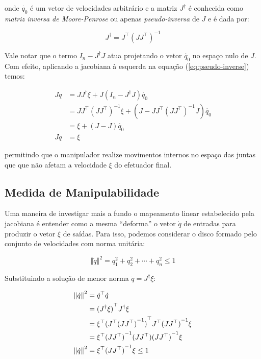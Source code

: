 onde \(\dot{q_0}\) é um vetor de velocidades arbitrário e a matriz \(J^\dag\) é
conhecida como \emph{matriz inversa de Moore-Penrose} ou apenas
\emph{pseudo-inversa} de \(J\) e é dada por:

\begin{equation}
    J^\dag = J^\top {(J J^\top)}^{-1}
\end{equation}

Vale notar que o termo \(I_n - J^\dag J\) atua projetando o vetor \(\dot{q_0}\)
no espaço nulo de \(J\). Com efeito, aplicando a jacobiana à esquerda na
equação (\ref{eq:pseudo-inverse}) temos:

\begin{align*}
    J \dot{q} & = J J^\dag \xi + J (I_n - J^\dag J) \dot{q_0}                                   \\
              & = J J^\top {(J J^\top)}^{-1} \xi + (J - J J^\top {(J J^\top)}^{-1} J) \dot{q_0} \\
              & = \xi + (J - J) \dot{q_0}                                                       \\
    J \dot{q} & = \xi
\end{align*}

permitindo que o manipulador realize movimentos internos no espaço das juntas
que que não afetam a velocidade \(\xi\) do efetuador final.

\subsection{Medida de Manipulabilidade}

Uma maneira de investigar mais a fundo o mapeamento linear estabelecido pela
jacobiana é entender como a mesma ``deforma'' o vetor \(\dot{q}\) de entradas
para produzir o vetor \(\xi\) de saídas. Para isso, podemos considerar o disco
formado pelo conjunto de velocidades com norma unitária:

\begin{equation}
    \left\Vert \dot{q} \right\Vert^2 = q_1^2 + q_2^2 + \cdots + q_n^2 \leq 1
\end{equation}

Substituindo a solução de menor norma \(\dot{q} = J^\dag \xi\):

\begin{align}\label{eq:manipulability-ellipsoid}
    \left\Vert \dot{q} \right\Vert^2 & = \dot{q}^\top \dot{q} \notag                                                    \\
                                     & = {(J^\dag \xi)}^\top J^\dag \xi \notag                                          \\
                                     & = \xi^\top {(J^\top {(J J^\top)}^{-1})}^\top J^\top {(J J^\top)}^{-1} \xi \notag \\
                                     & = \xi^\top {(J J^\top)}^{-1} (J J^\top) {(J J^\top)}^{-1} \xi \notag             \\
    \left\Vert \dot{q} \right\Vert^2 & = \xi^\top {(J J^\top)}^{-1} \xi \leq 1
\end{align}


